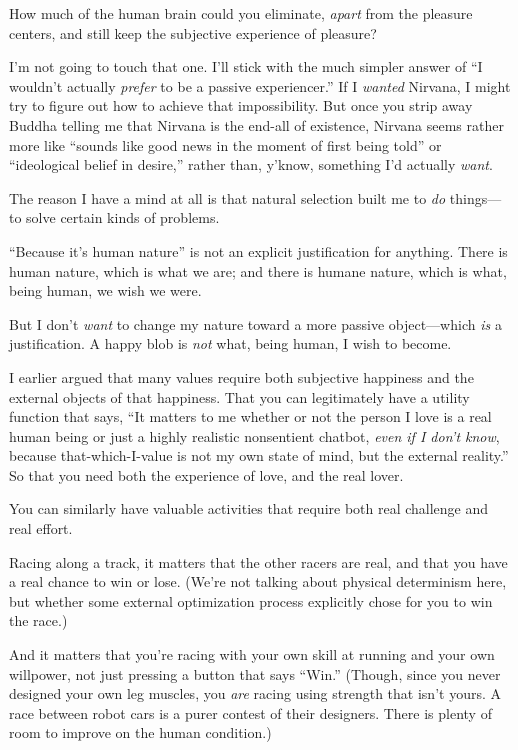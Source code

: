 {
 How much of the human brain could you eliminate, \textit{apart}
from the pleasure centers, and still keep the subjective experience of
pleasure?}

{
 I'm not going to touch that one.
I'll stick with the much simpler answer of
``I wouldn't actually \textit{prefer}
to be a passive experiencer.'' If I \textit{wanted}
Nirvana, I might try to figure out how to achieve that impossibility.
But once you strip away Buddha telling me that Nirvana is the end-all
of existence, Nirvana seems rather more like ``sounds
like good news in the moment of first being told'' or
``ideological belief in desire,''
rather than, y'know, something I'd
actually \textit{want}.}

{
 The reason I have a mind at all is that natural selection built me
to \textit{do} things---to solve certain kinds of problems.}

{
 ``Because it's human
nature'' is not an explicit justification for
anything. There is human nature, which is what we are; and there is
humane nature, which is what, being human, we wish we were.}

{
 But I don't \textit{want} to change my nature
toward a more passive object---which \textit{is} a justification. A
happy blob is \textit{not} what, being human, I wish to become.}

{
 I earlier argued that many values require both subjective
happiness and the external objects of that happiness. That you can
legitimately have a utility function that says, ``It
matters to me whether or not the person I love is a real human being or
just a highly realistic nonsentient chatbot, \textit{even if I
don't know}, because that-which-I-value is not my own
state of mind, but the external reality.'' So that
you need both the experience of love, and the real lover.}

{
 You can similarly have valuable activities that require both real
challenge and real effort.}

{
 Racing along a track, it matters that the other racers are real,
and that you have a real chance to win or lose. (We're
not talking about physical determinism here, but whether some external
optimization process explicitly chose for you to win the race.)}

{
 And it matters that you're racing with your own
skill at running and your own willpower, not just pressing a button
that says ``Win.'' (Though, since
you never designed your own leg muscles, you \textit{are} racing using
strength that isn't yours. A race between robot cars is
a purer contest of their designers. There is plenty of room to improve
on the human condition.)}


